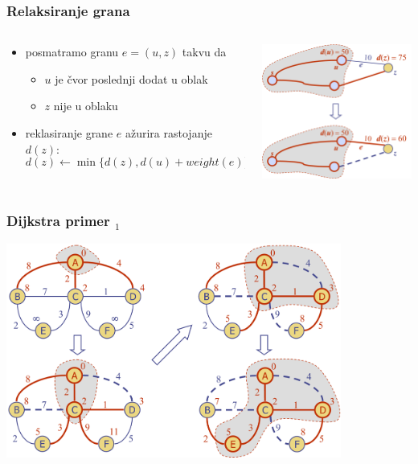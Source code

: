 \documentclass[compress,aspectratio=169]{beamer}
\begin{document}
\begin{frame}[fragile]
  \frametitle{Relaksiranje grana}
  \begin{columns}
    \begin{column}[t]{6cm}
      \begin{itemize}
        \item posmatramo granu $e=(u,z)$ takvu da
        \begin{itemize}
          \item $u$ je čvor poslednji dodat u oblak
          \item $z$ nije u oblaku
        \end{itemize}
        \item reklasiranje grane $e$ ažurira rastojanje $d(z)$:
          $$ d(z) \leftarrow \min\{d(z), d(u)+weight(e)\}$$
      \end{itemize}
    \end{column}
    \begin{column}[t]{6cm}
  \begin{center}
    \includegraphics[width=5cm]{asp-14-pic61.png}
  \end{center}
    \end{column}
  \end{columns}
\end{frame}

\begin{frame}[fragile]
  \frametitle{Dijkstra primer $_1$}
  \begin{center}
    \includegraphics[width=11cm]{asp-14-pic62.png}
  \end{center}
\end{frame}
\end{document}
